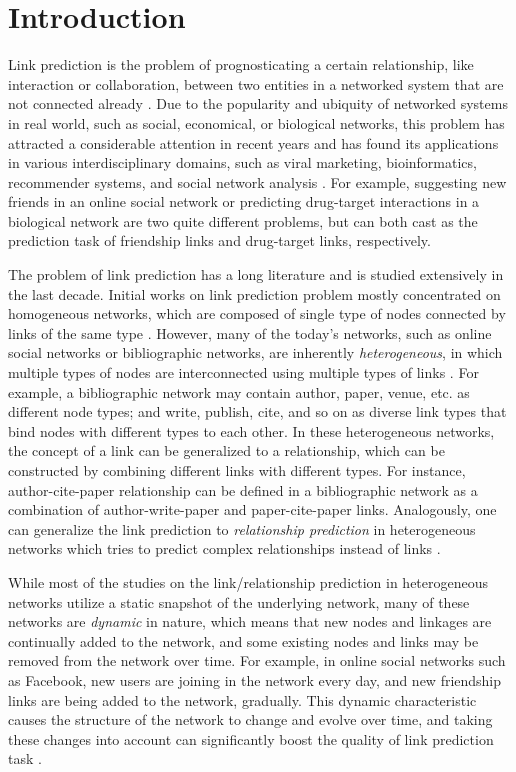 \section{Introduction}\label{sec:intro}
Link prediction is the problem of prognosticating a certain relationship, like interaction or collaboration, between two entities in a networked system that are not connected already \cite{lu2011link}. Due to the popularity and ubiquity of networked systems in real world, such as social, economical, or biological networks, this problem has attracted a considerable attention in recent years and has found its applications in various interdisciplinary domains, such as viral marketing, bioinformatics, recommender systems, and social network analysis \cite{wasserman1994social}. For example, suggesting new friends in an online social network \cite{liben2007link} or predicting drug-target interactions in a biological network \cite{chen2012drug} are two quite different problems, but can both cast as the prediction task of friendship links and drug-target links, respectively.

The problem of link prediction has a long literature and is studied extensively in the last decade. Initial works on link prediction problem mostly concentrated on homogeneous networks, which are composed of single type of nodes connected by links of the same type \cite{liben2007link, wang2007local, lichtenwalter2010new}. However, many of the today's networks, such as online social networks or bibliographic networks, are inherently \emph{heterogeneous}, in which multiple types of nodes are interconnected using multiple types of links \cite{taskar2004link, shi2017survey}. For example, a bibliographic network may contain author, paper, venue, etc. as different node types; and write, publish, cite, and so on as diverse link types that bind nodes with different types to each other. In these heterogeneous networks, the concept of a link can be generalized to a relationship, which can be constructed by combining different links with different types. For instance, author-cite-paper relationship can be defined in a bibliographic network as a combination of author-write-paper and paper-cite-paper links. Analogously, one can generalize the link prediction to \emph{relationship prediction} in heterogeneous networks which tries to predict complex relationships instead of links \cite{sun2012will}.

While most of the studies on the link/relationship prediction in heterogeneous networks utilize a static snapshot of the underlying network, many of these networks are \emph{dynamic} in nature, which means that new nodes and linkages are continually added to the network, and some existing nodes and links may be removed from the network over time. For example, in online social networks such as Facebook, new users are joining in the network every day, and new friendship links are being added to the network, gradually. This dynamic characteristic causes the structure of the network to change and evolve over time, and taking these changes into account can significantly boost the quality of link prediction task \cite{potgieter2009temporality}.

